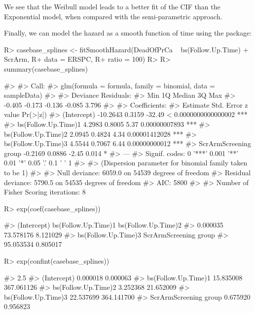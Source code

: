 \documentclass[
]{jss}
\begin{document}
We see that the Weibull model leads to a better fit of the CIF than the
Exponential model, when compared with the semi-parametric approach.

Finally, we can model the hazard as a smooth function of time using the
 package:

\begin{CodeChunk}

\begin{CodeInput}
R> casebase_splines <- fitSmoothHazard(DeadOfPrCa ~ bs(Follow.Up.Time) + ScrArm, 
R+                                     data = ERSPC, 
R+                                     ratio = 100)
R> 
R> summary(casebase_splines)
\end{CodeInput}

\begin{CodeOutput}
#> 
#> Call:
#> glm(formula = formula, family = binomial, data = sampleData)
#> 
#> Deviance Residuals: 
#>    Min      1Q  Median      3Q     Max  
#> -0.405  -0.173  -0.136  -0.085   3.796  
#> 
#> Coefficients:
#>                       Estimate Std. Error z value             Pr(>|z|)    
#> (Intercept)           -10.2643     0.3159  -32.49 < 0.0000000000000002 ***
#> bs(Follow.Up.Time)1     4.2983     0.8005    5.37        0.00000007893 ***
#> bs(Follow.Up.Time)2     2.0945     0.4824    4.34        0.00001412028 ***
#> bs(Follow.Up.Time)3     4.5544     0.7067    6.44        0.00000000012 ***
#> ScrArmScreening group  -0.2169     0.0886   -2.45                0.014 *  
#> ---
#> Signif. codes:  0 '***' 0.001 '**' 0.01 '*' 0.05 '.' 0.1 ' ' 1
#> 
#> (Dispersion parameter for binomial family taken to be 1)
#> 
#>     Null deviance: 6059.0  on 54539  degrees of freedom
#> Residual deviance: 5790.5  on 54535  degrees of freedom
#> AIC: 5800
#> 
#> Number of Fisher Scoring iterations: 8
\end{CodeOutput}

\begin{CodeInput}
R> exp(coef(casebase_splines))
\end{CodeInput}

\begin{CodeOutput}
#>           (Intercept)   bs(Follow.Up.Time)1   bs(Follow.Up.Time)2 
#>              0.000035             73.578176              8.121029 
#>   bs(Follow.Up.Time)3 ScrArmScreening group 
#>             95.053534              0.805017
\end{CodeOutput}

\begin{CodeInput}
R> exp(confint(casebase_splines))
\end{CodeInput}

\begin{CodeOutput}
#>                           2.5 %
#> (Intercept)            0.000018   0.000063
#> bs(Follow.Up.Time)1   15.835008 367.061126
#> bs(Follow.Up.Time)2    3.252368  21.652009
#> bs(Follow.Up.Time)3   22.537699 364.141700
#> ScrArmScreening group  0.675920   0.956823
\end{CodeOutput}
\end{CodeChunk}
\end{document}
